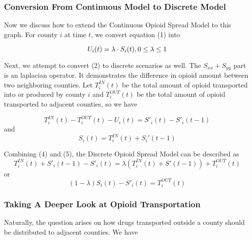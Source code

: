 \subsubsection{Conversion From Continuous Model to Discrete Model}
Now we discuss how to extend the Continuous Opioid Spread Model to this graph. For county $i$ at time $t$, we convert equation (1) into

\begin{equation}
U_i(t) = \lambda\cdot S_i(t), 0\leq \lambda \leq 1 \\
\end{equation}

Next, we attempt to convert (2) to discrete scenarios as well. The $S_{xx}+S_{yy}$ part is an laplacian operator. It demonstrates the difference in opioid amount between two neighboring counties.  Let $T^{IN}_i(t)$ be the total amount of opioid transported into or produced by county $i$ and $T^{OUT}_i(t)$ be the total amount of opioid transported to adjacent counties, so we have

\begin{equation}
T^{IN}_i(t)-T^{OUT}_i(t) - U_i(t)= S'_i(t)-S'_i(t-1)
\end{equation}
and 
\begin{equation}
S_i(t) = T^{IN}_i(t) + S_i'(t-1)
\end{equation}

Combining (4) and (5), the Discrete Opioid Spread Model can be described as
\begin{equation}
T^{IN}_i(t) + S'_i(t-1)-S'_i(t) = \lambda(T^{IN}_i(t) + S'(t-1))+ T^{OUT}_i(t)
\end{equation}
or 
\begin{equation}
(1-\lambda)S_i(t)-S'_i(t) = T^{OUT}_i(t)
\end{equation}

\begin{comment}
\textit{
In the previous subsection, we pointed out that $\lambda$ is a socio-economic factor impling the relationship between opioid usage and opioid storage. In the discrete scenario, we can describe it as
}
\begin{equation}
\lambda = \frac{U_i(t)}{S_i(t)} = \frac{S_i(t) -\sum_{j\in N_i}S_j(t)}{S_i(t)}
\end{equation}
\end{comment}
\subsubsection{Taking A Deeper Look at Opioid Transportation}
Naturally, the question arises on how drugs transported outside a county should be distributed to adjacent counties. We have


